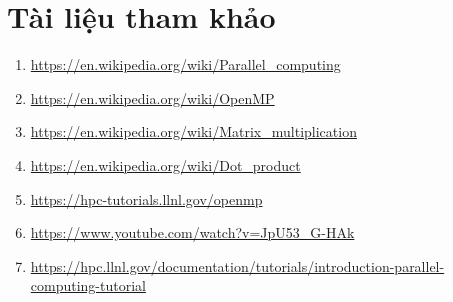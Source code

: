 \newpage
\section*{Tài liệu tham khảo}
 {}

\begin{enumerate}[label=(\arabic*)]
 \item \url{https://en.wikipedia.org/wiki/Parallel_computing}
 \item \url{https://en.wikipedia.org/wiki/OpenMP}
 \item \url{https://en.wikipedia.org/wiki/Matrix_multiplication}
 \item \url{https://en.wikipedia.org/wiki/Dot_product}
 \item \url{https://hpc-tutorials.llnl.gov/openmp}
 \item \url{https://www.youtube.com/watch?v=JpU53_G-HAk}
 \item \url{https://hpc.llnl.gov/documentation/tutorials/introduction-parallel-computing-tutorial}
 
\end{enumerate}